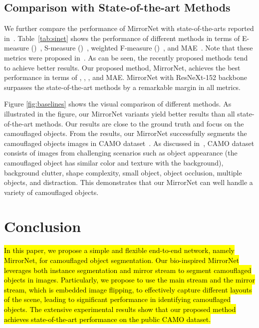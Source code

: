 \documentclass[journal]{IEEEtran}
\DeclareRobustCommand{\hlcyan}[1]{{\sethlcolor{white}\hl{#1}}}
\begin{document}
\subsection{Comparison with State-of-the-art Methods}
We further compare the performance of MirrorNet with state-of-the-arts reported in~\cite{sinet}. Table~\ref{tab:sinet} shows the performance of different methods in terms of E-measure ()~\cite{ephi},  S-measure ()~\cite{smeasure}, weighted F-measure ()~\cite{weightedf}, and MAE~\cite{CAMO}. Note that these metrics were proposed in~\cite{sinet}. As can be seen, the recently proposed methods tend to achieve better results. Our proposed method, MirrorNet, achieves the best performance in terms of ,  , , and MAE. MirrorNet with ResNeXt-152 backbone surpasses the state-of-the-art methods by a remarkable margin in all metrics. 





Figure \ref{fig:baselines} shows the visual comparison of different methods. As illustrated in the figure, our MirrorNet variants yield better results than all state-of-the-art methods. Our results are close to the ground truth and focus on the camouflaged objects. From the results, our MirrorNet successfully segments the camouflaged objects images in CAMO dataset~\cite{CAMO}. As discussed in~\cite{CAMO}, CAMO dataset consists of images from challenging scenarios such as object appearance (the camouflaged object has similar color and texture with the background), background clutter, shape complexity, small object, object occlusion, multiple objects, and distraction. This demonstrates that our MirrorNet can well handle a variety of camouflaged objects. 

\section{Conclusion}
\label{sec:conclusion}

\hlcyan{In this paper, we propose a simple and flexible end-to-end network, namely MirrorNet, for camouflaged object segmentation. Our bio-inspired MirrorNet leverages both instance segmentation and mirror stream to segment camouflaged objects in images. Particularly, we propose to use the main  stream and the mirror stream, which is embedded image flipping, to effectively capture different layouts of the scene, leading to significant performance in identifying camouflaged objects. The extensive experimental results show that our proposed method achieves state-of-the-art performance on the public CAMO dataset.}
\end{document}
